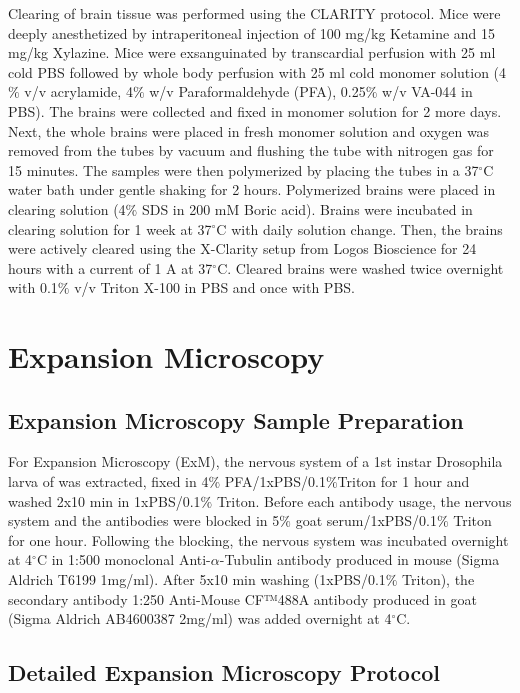 Clearing of brain tissue was performed using the CLARITY protocol\cite{clarity}. Mice were deeply anesthetized by intraperitoneal injection of 100 mg/kg Ketamine and 15 mg/kg Xylazine. Mice were exsanguinated by transcardial perfusion with 25 ml cold PBS followed by whole body perfusion with 25 ml cold monomer solution (4$\%$ v/v acrylamide, 4$\%$ w/v Paraformaldehyde (PFA), 0.25$\%$ w/v VA-044 in PBS). The brains were collected and fixed in monomer solution for 2 more days. Next, the whole brains were placed in fresh monomer solution and oxygen was removed from the tubes by vacuum and flushing the tube with nitrogen gas for 15 minutes. The samples were then polymerized by placing the tubes in a 37${}^\circ$C water bath under gentle shaking for 2 hours. Polymerized brains were placed in clearing solution (4$\%$ SDS in 200 mM Boric acid). Brains were incubated in clearing solution for 1 week at 37${}^\circ$C with daily solution change. Then, the brains were actively cleared using the X-Clarity setup from Logos Bioscience for 24 hours with a current of 1 A at 37${}^\circ$C. Cleared brains were washed twice overnight with 0.1$\%$ v/v Triton X-100 in PBS and once with PBS.


\section{Expansion Microscopy}
\label{sec:expansion}

\subsection*{Expansion Microscopy Sample Preparation}

For Expansion Microscopy (ExM), the nervous system of a 1st instar Drosophila larva of was extracted, fixed in 4$\%$ PFA/1xPBS/0.1$\%$Triton for 1 hour and washed 2x10 min in 1xPBS/0.1$\%$ Triton. Before each antibody usage, the nervous system and the antibodies were blocked in 5$\%$ goat serum/1xPBS/0.1$\%$ Triton for one hour. Following the blocking, the nervous system was incubated overnight at 4${}^\circ$C in 1:500 monoclonal Anti-$\alpha$-Tubulin antibody produced in mouse (Sigma Aldrich T6199 1mg/ml). After 5x10 min washing (1xPBS/0.1$\%$ Triton), the secondary antibody 1:250 Anti-Mouse CF™488A antibody produced in goat (Sigma Aldrich AB4600387 2mg/ml) was added overnight at 4${}^\circ$C. 

\subsection*{Detailed Expansion Microscopy Protocol}

